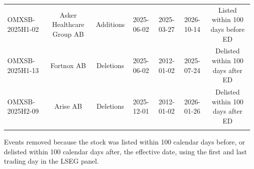 \begin{threeparttable}
\begin{tabular}{@{}lcccccc}
\addlinespace[0.25ex]
\addlinespace[0.25ex]
OMXSB-2025H1-02 & Asker Healthcare Group AB & Additions & 2025-06-02 & 2025-03-27 & 2026-10-14 & Listed within 100 days before ED \\
\addlinespace[0.25ex]
\addlinespace[0.25ex]
OMXSB-2025H1-13 & Fortnox AB & Deletions & 2025-06-02 & 2012-01-02 & 2025-07-24 & Delisted within 100 days after ED \\
\addlinespace[0.25ex]
\addlinespace[0.25ex]
OMXSB-2025H2-09 & Arise AB & Deletions & 2025-12-01 & 2012-01-02 & 2026-01-26 & Delisted within 100 days after ED \\
\addlinespace[0.25ex]
\bottomrule
\end{tabular}
\endgroup
\noindent\begin{minipage}{\linewidth}\smallskip\footnotesize
Events removed because the stock was listed within 100 calendar days before, or delisted within 100 calendar days after, the effective date, using the first and last trading day in the LSEG panel.\end{minipage}

\end{threeparttable}